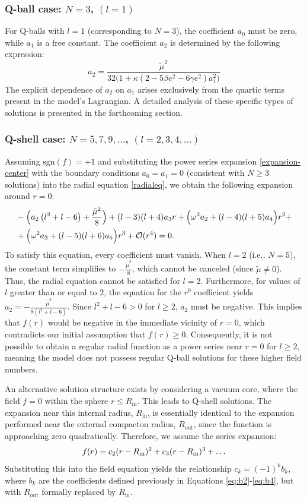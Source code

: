 \documentclass[aps,prd,superscriptaddress,notitlepage,11pt,final,longbibliography,nofootinbib]{revtex4-1}
\numberwithin{equation}{section}
\begin{document}
\subsubsection{Q-ball case: $N=3$, $(l=1)$}
For Q-balls with $l=1$ (corresponding to $N=3$), the coefficient $a_0$ must be zero, while $a_1$ is a free constant. The coefficient $a_2$ is determined by the following expression:
\begin{equation}
a_2=\frac{\widetilde\mu ^2}{32 \Big(1+\kappa  \left(2-5 \beta  e^2-6 \gamma  e^2\right)a_1^2 \Big)}\label{CP3a2}
\end{equation}
The explicit dependence of $a_2$ on $a_1$ arises exclusively from the quartic terms present in the model's Lagrangian. A detailed analysis of these specific types of solutions is presented in the forthcoming section.

\subsubsection{Q-shell case: $N=5,7,9,\ldots$, $(l=2,3,4,\ldots)$}
Assuming $\text{sgn}(f)=+1$ and substituting the power series expansion \eqref{expansion-center} with the boundary conditions $a_0=a_1=0$ (consistent with $N \ge 3$ solutions) into the radial equation \eqref{radialeq}, we obtain the following expansion around $r=0$:
\begin{align*}
&-\Big(a_2 \left(l^2+l-6\right)+\frac{\tilde\mu ^2}{8}\Big)+(l-3)(l+4)a_3 r+\Big(\omega^2a_2+(l-4)(l+5)a_4\Big)r^2+\\
&+\Big(\omega^2a_3+(l-5)(l+6)a_5\Big)r^3+{\cal O}(r^4)=0.
\end{align*}
To satisfy this equation, every coefficient must vanish. When $l=2$ (i.e., $N=5$), the constant term simplifies to $-\frac{\tilde{\mu}^2}{8}$, which cannot be canceled (since $\tilde{\mu} \ne 0$). Thus, the radial equation cannot be satisfied for $l=2$. Furthermore, for values of $l$ greater than or equal to $2$, the equation for the $r^0$ coefficient yields $a_2 = -\frac{\tilde{\mu}^2}{8(l^2+l-6)}$. Since $l^2+l-6 > 0$ for $l \ge 2$, $a_2$ must be negative. This implies that $f(r)$ would be negative in the immediate vicinity of $r=0$, which contradicts our initial assumption that $f(r) \ge 0$. Consequently, it is not possible to obtain a regular radial function as a power series near $r=0$ for $l \ge 2$, meaning the model does not possess regular Q-ball solutions for these higher field numbers.

An alternative solution structure exists by considering a vacuum core, where the field $f=0$ within the sphere $r \le R_{\text{in}}$. This leads to Q-shell solutions. The expansion near this internal radius, $R_{\text{in}}$, is essentially identical to the expansion performed near the external compacton radius, $R_{\text{out}}$, since the function is approaching zero quadratically. Therefore, we assume the series expansion:
\[
f(r)=c_2(r-R_{\rm in})^2+c_3(r-R_{\rm in})^3+\ldots
\]  
Substituting this into the field equation yields the relationship $c_k=(-1)^k b_k$, where $b_k$ are the coefficients defined previously in Equations \eqref{eq:b2}-\eqref{eq:b4}, but with $R_{\text{out}}$ formally replaced by $R_{\text{in}}$.
\end{document}
